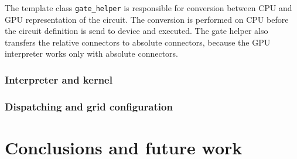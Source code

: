 \documentclass[12pt,oneside]{fithesis2}
\begin{document}
The template class \texttt{gate\_helper} is responsible for conversion between CPU and GPU representation of the circuit. The conversion is performed on CPU before the circuit definition is send to device and executed. The gate helper also transfers the relative connectors to absolute connectors, because the GPU interpreter works only with absolute connectors.

\subsection{Interpreter and kernel}
\subsection{Dispatching and grid configuration}

\chapter{Conclusions and future work}



\printbibliography[heading=bibintoc]
\end{document}

